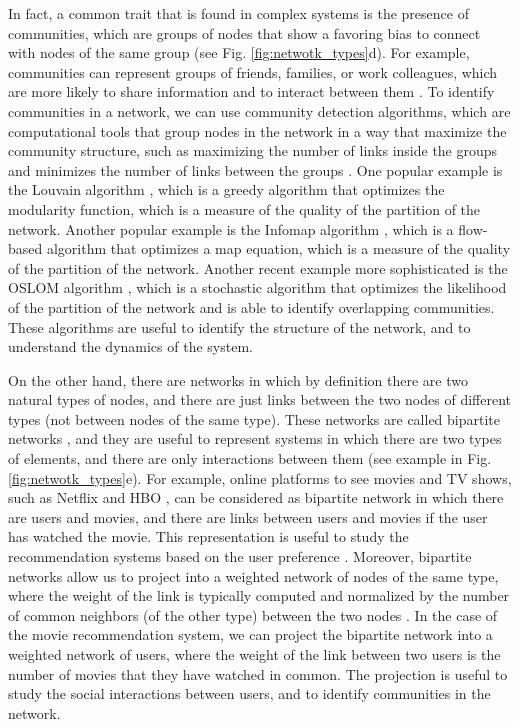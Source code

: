In fact, a common trait that is found in complex systems is the presence of communities, which are groups of nodes that show a favoring bias to connect with nodes of the same group \cite{girvan-2002} (see Fig. \ref{fig:netwotk_types}d). For example, communities can represent groups of friends, families, or work colleagues, which are more likely to share information and to interact between them \cite{newman2003structure}. To identify communities in a network, we can use community detection algorithms, which are computational tools that group nodes in the network in a way that maximize the community structure, such as maximizing the number of links inside the groups and minimizes the number of links between the groups \cite{lancichinetti-2008,fortunato2010community}. One popular example is the Louvain algorithm \cite{blondel-2008}, which is a greedy algorithm that optimizes the modularity function, which is a measure of the quality of the partition of the network. Another popular example is the Infomap algorithm \cite{rosvall-2008}, which is a flow-based algorithm that optimizes a map equation, which is a measure of the quality of the partition of the network. Another recent example more sophisticated is the OSLOM algorithm \cite{OSLOM}, which is a stochastic algorithm that optimizes the likelihood of the partition of the network and is able to identify overlapping communities. These algorithms are useful to identify the structure of the network, and to understand the dynamics of the system.

On the other hand, there are networks in which by definition there are two natural types of nodes, and there are just links between the two nodes of different types (not between nodes of the same type). These networks are called bipartite networks \cite{newman2003structure}, and they are useful to represent systems in which there are two types of elements, and there are only interactions between them \cite{latapy-2008} (see example in Fig. \ref{fig:netwotk_types}e). For example, online platforms to see movies and TV shows, such as Netflix \cite{netflix} and HBO \cite{HBO}, can be considered as bipartite network in which there are users and movies, and there are links between users and movies if the user has watched the movie. This representation is useful to study the recommendation systems based on the user preference \cite{ricci-2011}. Moreover, bipartite networks allow us to project into a weighted network of nodes of the same type, where the weight of the link is typically computed and normalized by the number of common neighbors (of the other type) between the two nodes \cite{newman-2001-collaboration}. In the case of the movie recommendation system, we can project the bipartite network into a weighted network of users, where the weight of the link between two users is the number of movies that they have watched in common. The projection is useful to study the social interactions between users, and to identify communities in the network.

